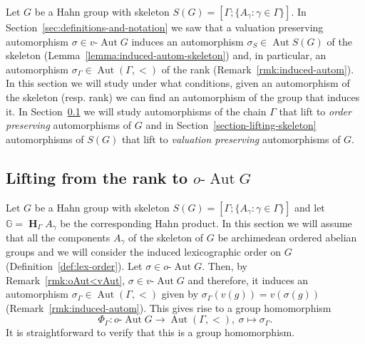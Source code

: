 \documentclass[12pt,a4paper,reqno,openright]{amsart}
\newcommand{\bbG}{{\mathbb G}}
\newcommand{\lra}{\longrightarrow}
\renewcommand{\1}{\mathbbm{1}}
\newcommand{\G}{\Gamma}
\DeclareMathOperator{\Aut}{Aut}
\newcommand{\vAut}{v\text{-}\Aut}
\newcommand{\oAut}{o\text{-}\Aut}
\newcommand{\GG}{\bbG}
\DeclareMathOperator*\HH{\mathbf{H}}
\theoremstyle{definition}
\theoremstyle{plain}
\theoremstyle{plain}
\theoremstyle{plain}
\theoremstyle{plain}
\theoremstyle{plain}
\theoremstyle{plain}
\theoremstyle{plain}
\theoremstyle{plain}
\theoremstyle{definition}
\theoremstyle{definition}
\theoremstyle{plain}
\theoremstyle{definition}
\theoremstyle{definition}
\theoremstyle{plain}
\theoremstyle{plain}
\theoremstyle{plain}
\begin{document}
Let $ G $ be a Hahn group with skeleton $ S(G) = [\Gamma;\{A_\gamma:\gamma\in\Gamma\}] $.
In Section~\ref{sec:definitions-and-notation} we saw that a valuation preserving automorphism $ \sigma\in\vAut G $ induces an automorphism $\sigma_S\in\Aut S(G) $ of the skeleton (Lemma~\ref{lemma:induced-autom-skeleton}) and, in particular, an automorphism $ \sigma_\Gamma\in\Aut(\G, <) $ of the rank (Remark~\ref{rmk:induced-autom}). In this section we will study under what conditions, given an automorphism of the skeleton (resp. rank) we can find an automorphism of the group that induces it. In Section~\ref{sec:lifting-property-with-respect-to-the-rank} we will study automorphisms of the chain $ \Gamma $ that lift to \emph{order preserving} automorphisms of $ G $ and in Section~\ref{section-lifting-skeleton} automorphisms of $ S(G) $ that lift to \emph{valuation preserving} automorphisms of $ G $.

\subsection{Lifting from the rank to $ \oAut G $}\label{sec:lifting-property-with-respect-to-the-rank}
Let $G$ be a Hahn group with skeleton $ S(G) = [\Gamma;\{A_\gamma:\gamma\in\Gamma\}] $ and let $ \GG = \HH_\Gamma A_\gamma $ be the corresponding Hahn product.
In this section we will assume that all the components $ A_\gamma $ of the skeleton of $ G $ be archimedean ordered abelian groups and we will consider the induced lexicographic order on $ G $ (Definition~\ref{def:lex-order}).
Let $\sigma \in \oAut G$. Then, by Remark~\ref{rmk:oAut<vAut}, $ \sigma\in\vAut G $ and therefore, it induces an automorphism $\sigma_{\Gamma}\in\Aut(\G, <) $ given by $\sigma_{\Gamma}(v(g)) = v(\sigma(g))$ (Remark~\ref{rmk:induced-autom}).
This gives rise to a group homomorphism
\begin{equation}\label{eq:phi-rank}
\Phi_\Gamma:\oAut G \lra \Aut(\G, <),\ \sigma\longmapsto \sigma_\Gamma.
\end{equation}
It is straightforward to verify that this is a group homomorphism.
\end{document}
